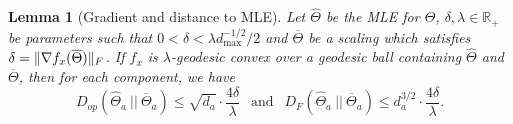\documentclass[aos]{imsart}
\newtheorem{lemma}[theorem]{Lemma}
\theoremstyle{definition}
\numberwithin{equation}{section}
\DeclarePairedDelimiter{\norm}{\lVert}{\rVert}
\newcommand{\R}{{\mathbb{R}}}
\newcommand{\otheta}{\overline{\Theta}}
\newcommand{\htheta}{\widehat{\Theta}}
\def\dmax{d_{\max}}
\newcommand{\RMO}[1]{{\color{red}[RMO: #1]}}
\begin{document}
%
%
%

\begin{lemma}[Gradient and distance to MLE]\label{lem:tensor-distance-opt}
	Let $\htheta$ be the MLE for $\Theta$, $\delta, \lambda \in \R_+$ be  parameters such that
	$0 < \delta < \lambda \dmax^{-1/2}/2$ and $\otheta$ be a scaling which satisfies $\delta = \norm{\nabla f_x(\otheta)}_F$. If $f_x$ is $\lambda$-geodesic convex over a geodesic ball containing $\htheta$ and $\otheta$, then for each component, we have
	$$ D_{op}(\htheta_a \ || \ \otheta_a) \leq \sqrt{d_a} \cdot \frac{4\delta}{\lambda}  \ \ \text{ and } \ \ D_F(\htheta_a \ || \ \otheta_a) \leq d_a^{3/2} \cdot \frac{4\delta}{\lambda}. $$
\end{lemma}
\end{document}
